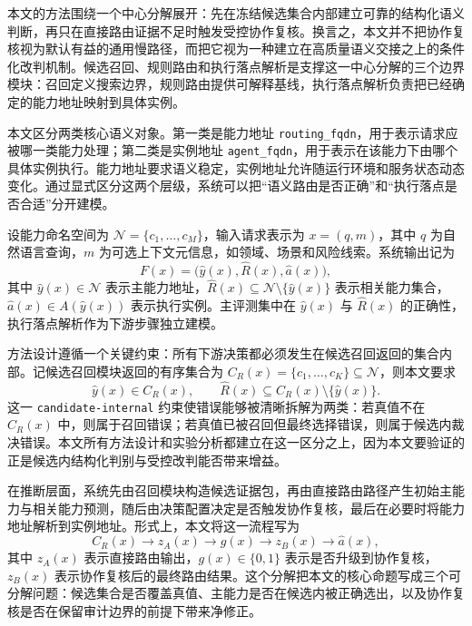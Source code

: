 \documentclass[11pt,a4paper]{ctexart}
\begin{document}
本文的方法围绕一个中心分解展开：先在冻结候选集合内部建立可靠的结构化语义判断，再只在直接路由证据不足时触发受控协作复核。换言之，本文并不把协作复核视为默认有益的通用慢路径，而把它视为一种建立在高质量语义交接之上的条件化改判机制。候选召回、规则路由和执行落点解析是支撑这一中心分解的三个边界模块：召回定义搜索边界，规则路由提供可解释基线，执行落点解析负责把已经确定的能力地址映射到具体实例。

本文区分两类核心语义对象。第一类是能力地址 \texttt{routing\_fqdn}，用于表示请求应被哪一类能力处理；第二类是实例地址 \texttt{agent\_fqdn}，用于表示在该能力下由哪个具体实例执行。能力地址要求语义稳定，实例地址允许随运行环境和服务状态动态变化。通过显式区分这两个层级，系统可以把“语义路由是否正确”和“执行落点是否合适”分开建模。

设能力命名空间为 $\mathcal{N}=\{c_1,\ldots,c_M\}$，输入请求表示为 $x=(q,m)$，其中 $q$ 为自然语言查询，$m$ 为可选上下文元信息，如领域、场景和风险线索。系统输出记为
\begin{equation}
F(x)=\bigl(\hat y(x), \hat R(x), \hat a(x)\bigr),
\end{equation}
其中 $\hat y(x)\in\mathcal{N}$ 表示主能力地址，$\hat R(x)\subseteq\mathcal{N}\setminus\{\hat y(x)\}$ 表示相关能力集合，$\hat a(x)\in A(\hat y(x))$ 表示执行实例。主评测集中在 $\hat y(x)$ 与 $\hat R(x)$ 的正确性，执行落点解析作为下游步骤独立建模。

方法设计遵循一个关键约束：所有下游决策都必须发生在候选召回返回的集合内部。记候选召回模块返回的有序集合为 $C_R(x)=\{c_1,\dots,c_K\}\subseteq\mathcal{N}$，则本文要求
\begin{equation}
\hat y(x)\in C_R(x), \qquad \hat R(x)\subseteq C_R(x)\setminus\{\hat y(x)\}.
\end{equation}
这一 \texttt{candidate-internal} 约束使错误能够被清晰拆解为两类：若真值不在 $C_R(x)$ 中，则属于召回错误；若真值已被召回但最终选择错误，则属于候选内裁决错误。本文所有方法设计和实验分析都建立在这一区分之上，因为本文要验证的正是候选内结构化判别与受控改判能否带来增益。

在推断层面，系统先由召回模块构造候选证据包，再由直接路由路径产生初始主能力与相关能力预测，随后由决策配置决定是否触发协作复核，最后在必要时将能力地址解析到实例地址。形式上，本文将这一流程写为
\begin{equation}
C_R(x)\rightarrow z_A(x)\rightarrow g(x)\rightarrow z_B(x)\rightarrow \hat a(x),
\end{equation}
其中 $z_A(x)$ 表示直接路由输出，$g(x)\in\{0,1\}$ 表示是否升级到协作复核，$z_B(x)$ 表示协作复核后的最终路由结果。这个分解把本文的核心命题写成三个可分解问题：候选集合是否覆盖真值、主能力是否在候选内被正确选出，以及协作复核是否在保留审计边界的前提下带来净修正。
\end{document}
